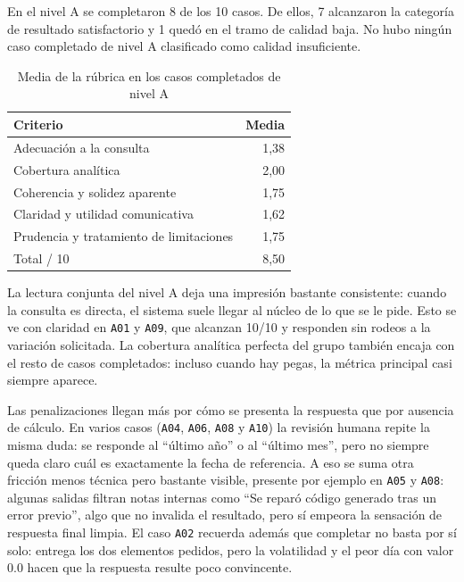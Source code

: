 En el nivel A se completaron 8 de los 10 casos. De ellos, 7 alcanzaron la categor\'ia de resultado satisfactorio y 1 
qued\'o en el tramo de calidad baja. No hubo ning\'un caso completado de nivel A clasificado como calidad insuficiente.

\begin{table}[h]
\centering
\begin{tabular}{lr}
\toprule
Criterio & Media \\
\midrule
Adecuaci\'on a la consulta & 1,38 \\
Cobertura anal\'itica & 2,00 \\
Coherencia y solidez aparente & 1,75 \\
Claridad y utilidad comunicativa & 1,62 \\
Prudencia y tratamiento de limitaciones & 1,75 \\
Total / 10 & 8,50 \\
\bottomrule
\end{tabular}
\caption{Media de la r\'ubrica en los casos completados de nivel A}
\label{tab:media-a}
\end{table}

La lectura conjunta del nivel A deja una impresi\'on bastante consistente: cuando la consulta es directa, el sistema suele 
llegar al n\'ucleo de lo que se le pide. Esto se ve con claridad en \texttt{A01} y \texttt{A09}, que alcanzan 10/10 y 
responden sin rodeos a la variaci\'on solicitada. La cobertura anal\'itica perfecta del grupo tambi\'en encaja con el resto 
de casos completados: incluso cuando hay pegas, la m\'etrica principal casi siempre aparece.

Las penalizaciones llegan m\'as por c\'omo se presenta la respuesta que por ausencia de c\'alculo. En varios casos 
(\texttt{A04}, \texttt{A06}, \texttt{A08} y \texttt{A10}) la revisi\'on humana repite la misma duda: se responde al 
``\'ultimo a\~no'' o al ``\'ultimo mes'', pero no siempre queda claro cu\'al es exactamente la fecha de referencia. A eso se 
suma otra fricci\'on menos t\'ecnica pero bastante visible, presente por ejemplo en \texttt{A05} y \texttt{A08}: algunas 
salidas filtran notas internas como ``Se repar\'o c\'odigo generado tras un error previo'', algo que no invalida el 
resultado, pero s\'i empeora la sensaci\'on de respuesta final limpia. El caso \texttt{A02} recuerda adem\'as que completar 
no basta por s\'i solo: entrega los dos elementos pedidos, pero la volatilidad y el peor d\'ia con valor 0.0 hacen que la 
respuesta resulte poco convincente.

